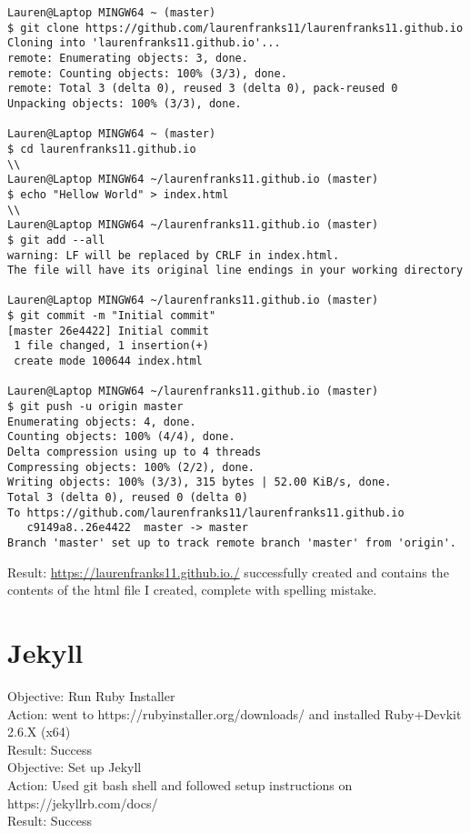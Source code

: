 \documentclass{article}
\begin{document}
\begin{verbatim}
Lauren@Laptop MINGW64 ~ (master)
$ git clone https://github.com/laurenfranks11/laurenfranks11.github.io
Cloning into 'laurenfranks11.github.io'...
remote: Enumerating objects: 3, done.
remote: Counting objects: 100% (3/3), done. 
remote: Total 3 (delta 0), reused 3 (delta 0), pack-reused 0 
Unpacking objects: 100% (3/3), done.

Lauren@Laptop MINGW64 ~ (master)
$ cd laurenfranks11.github.io
\\
Lauren@Laptop MINGW64 ~/laurenfranks11.github.io (master)
$ echo "Hellow World" > index.html
\\
Lauren@Laptop MINGW64 ~/laurenfranks11.github.io (master)
$ git add --all
warning: LF will be replaced by CRLF in index.html.
The file will have its original line endings in your working directory

Lauren@Laptop MINGW64 ~/laurenfranks11.github.io (master)
$ git commit -m "Initial commit"
[master 26e4422] Initial commit
 1 file changed, 1 insertion(+)
 create mode 100644 index.html

Lauren@Laptop MINGW64 ~/laurenfranks11.github.io (master)
$ git push -u origin master
Enumerating objects: 4, done.
Counting objects: 100% (4/4), done.
Delta compression using up to 4 threads
Compressing objects: 100% (2/2), done.
Writing objects: 100% (3/3), 315 bytes | 52.00 KiB/s, done.
Total 3 (delta 0), reused 0 (delta 0)
To https://github.com/laurenfranks11/laurenfranks11.github.io
   c9149a8..26e4422  master -> master
Branch 'master' set up to track remote branch 'master' from 'origin'.
\end{verbatim}

\noindent Result: \href{https://laurenfranks11.github.io./}{https://laurenfranks11.github.io./} successfully created and contains the contents of the html file I created, complete with spelling mistake.\\ 

\section{Jekyll}
Objective: Run Ruby Installer \\
Action: went to https://rubyinstaller.org/downloads/ and installed Ruby+Devkit 2.6.X (x64)  \\
Result: Success\\

Objective: Set up Jekyll\\
Action: Used git bash shell and followed setup instructions on https://jekyllrb.com/docs/ \\
Result: Success\\
\end{document}
